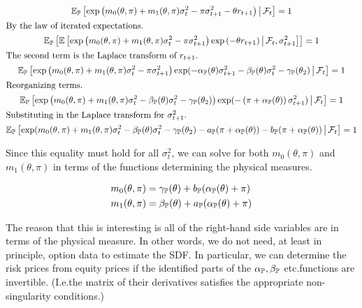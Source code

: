 \documentclass[11pt, letterpaper, twoside, final]{article}
\begin{document}
\begin{gather}
    \operatorname{\mathbb{E}}_{\mathbb{P}}\left[\exp\left(m_0(\theta, \pi) + m_1(\theta, \pi) \sigma^2_t - \pi \sigma^2_{t+1} - \theta r_{t+1}
    \right) \,\middle\vert\, \mathcal{F}_t \right] = 1 \\
    \intertext{By the law of iterated expectations.}
    \operatorname{\mathbb{E}}_{\mathbb{P}}\left[ \operatorname{\mathbb{E}}\left[\exp\left(m_0(\theta, \pi) + m_1(\theta, \pi) \sigma^2_t - \pi \sigma^2_{t+1}\right)
        \exp\left( - \theta r_{t+1}\right) \,\middle\vert\, \mathcal{F}_t, \sigma^2_{t+1} \right]\right] = 1 \\
    \intertext{The second term is the Laplace transform of $r_{t+1}$.}
    \operatorname{\mathbb{E}}_{\mathbb{P}}\left[\exp\left(m_0(\theta, \pi) + m_1(\theta, \pi) \sigma^2_t - \pi \sigma^2_{t+1} \right)
        \exp(-\alpha_{\mathbb{P}}(\theta) \sigma^2_{t+1} - \beta_{\mathbb{P}}(\theta) \sigma^2_{t} - \gamma_{\mathbb{P}}(\theta_2)
        \,\middle\vert\, \mathcal{F}_t \right] = 1 \\
    \intertext{Reorganizing terms.}
    \operatorname{\mathbb{E}}_{\mathbb{P}}\left[\exp\left(m_0(\theta, \pi) + m_1(\theta, \pi) \sigma^2_t - \beta_{\mathbb{P}}(\theta) \sigma^2_{t} -
        \gamma_{\mathbb{P}}(\theta_2) \right) \exp(-\left(\pi + \alpha_{\mathbb{P}}(\theta)\right) \sigma^2_{t+1}) \,\middle\vert\, \mathcal{F}_t
        \right] = 1 \\ 
    \intertext{Substituting in the Laplace transform for $\sigma^2_{t+1}$.} 
    \operatorname{\mathbb{E}}_{\mathbb{P}}\left[\exp(m_0(\theta, \pi) + m_1(\theta, \pi) \sigma^2_t - \beta_{\mathbb{P}}(\theta) \sigma^2_{t} -
        \gamma_{\mathbb{P}}(\theta_2)  - a_{\mathbb{P}}(\pi + \alpha_{\mathbb{P}}(\theta)) - b_{\mathbb{P}}(\pi + \alpha_{\mathbb{P}}(\theta))
        \,\middle\vert\, \mathcal{F}_t \right] = 1 
\end{gather}

Since this equality must hold for all $\sigma^2_{t}$, we can solve for both $m_0(\theta, \pi)$ and $m_1(\theta,
\pi)$ in terms of the functions determining the physical measures.

\begin{align}
    m_0(\theta, \pi)  &= \gamma_{\mathbb{P}}(\theta) + b_{\mathbb{P}}(\alpha_{\mathbb{P}}(\theta) + \pi) \\
    m_1(\theta, \pi)  &= \beta_{\mathbb{P}}(\theta) + a_{\mathbb{P}}(\alpha_{\mathbb{P}}(\theta) + \pi) 
\end{align}

The reason that this is interesting is all of the right-hand side variables  are in terms of the physical
measure.
In other words, we do not need, at least in principle, option data to estimate the SDF.
In particular, we can determine the risk prices from equity prices if the identified parts of the $\alpha_{\mathbb{P}},
\beta_{\mathbb{P}}$ etc.\@ functions are  invertible.
(I.e.\@ the matrix of their derivatives satisfies the appropriate non-singularity conditions.)
\end{document}
